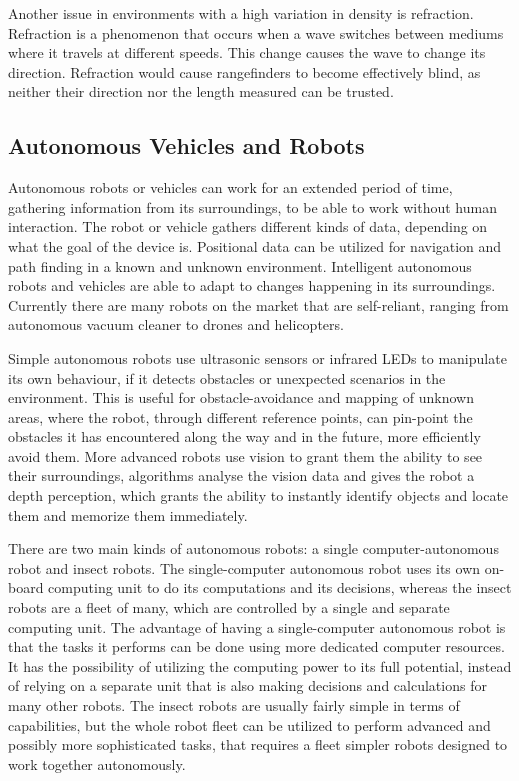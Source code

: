 Another issue in environments with a high variation in density is refraction. Refraction is a phenomenon that occurs when a wave switches between mediums where it travels at different speeds. This change causes the wave to change its direction. %
Refraction would cause rangefinders to become effectively blind, as neither their direction nor the length measured can be trusted.

\clearpage
\subsection{Autonomous Vehicles and Robots}

Autonomous robots or vehicles can work for an extended period of time, gathering information from its surroundings, to be able to work without human interaction. The robot or vehicle gathers different kinds of data, depending on what the goal of the device is. Positional data can be utilized for navigation and path finding in a known and unknown environment. Intelligent autonomous robots and vehicles are able to adapt to changes happening in its surroundings.
Currently there are many robots on the market that are self-reliant, ranging from autonomous vacuum cleaner to drones and helicopters\cite{autonomousbasic}.

Simple autonomous robots use ultrasonic sensors or infrared LEDs to manipulate its own behaviour, if it detects obstacles or unexpected scenarios in the environment. This is useful for obstacle-avoidance and mapping of unknown areas, where the robot, through different reference points, can pin-point the obstacles it has encountered along the way and in the future, more efficiently avoid them.
More advanced robots use vision to grant them the ability to see their surroundings, algorithms analyse the vision data and gives the robot a depth perception, which grants the ability to instantly identify objects and locate them and memorize them immediately\cite{obstacles}.

There are two main kinds of autonomous robots: a single computer-autonomous robot and insect robots. The single-computer autonomous robot uses its own on-board computing unit to do its computations and its decisions, whereas the insect robots are a fleet of many, which are controlled by a single and separate computing unit.
The advantage of having a single-computer autonomous robot is that the tasks it performs can be done using more dedicated computer resources. It has the possibility of utilizing the computing power to its full potential, instead of relying on a separate unit that is also making decisions and calculations for many other robots.
The insect robots are usually fairly simple in terms of capabilities, but the whole robot fleet can be utilized to perform advanced and possibly more sophisticated tasks, that requires a fleet simpler robots designed to work together autonomously\cite{singleandinsect}.


